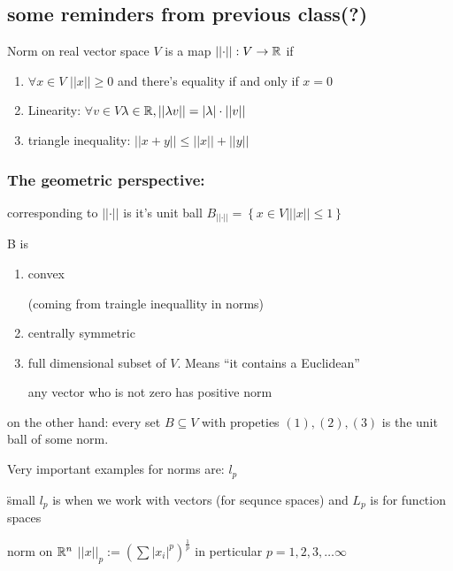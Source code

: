 \begin{insight}

\subsection{some reminders from previous class(?)}

Norm on real vector space $V$ is a map $\left|\left|\cdot\right|\right|:V\to\mathbb{R}$
if
\begin{enumerate}
\item $\forall x\in V$ $\left|\left|x\right|\right|\ge0$ and there\textquoteright s
equality if and only if $x=0$
\item Linearity: $\forall v\in V$$\lambda\in\mathbb{R},\left|\left|\lambda v\right|\right|=\left|\lambda\right|\cdot\left|\left|v\right|\right|$
\item triangle inequality: $\left|\left|x+y\right|\right|\le\left|\left|x\right|\right|+\left|\left|y\right|\right|$
\end{enumerate}
%

\subsubsection{The geometric perspective:}

corresponding to $\left|\left|\cdot\right|\right|$ is it's unit ball
$B_{\left|\left|\cdot\right|\right|}=\left\{ x\in V|\left|\left|x\right|\right|\le1\right\} $
\begin{fact}
B is
\begin{enumerate}
\item convex %
\begin{insight}
(coming from traingle inequallity in norms)%
\end{insight}
\item centrally symmetric
\item full dimensional subset of $V$. Means ``it contains a Euclidean''
\begin{insight}
any vector who is not zero has positive norm%
\end{insight}
\end{enumerate}
\end{fact}

on the other hand: every set $B\subseteq V$ with propeties $\left(1\right),\left(2\right),\left(3\right)$
is the unit ball of some norm.
\begin{example}
Very important examples for norms are: $l_{p}$%
\begin{insight}
\"{s}mall $l_{p}$ is when we work with vectors (for sequnce spaces)
and $L_{p}$ is for function spaces%
\end{insight}
{} norm on $\mathbb{R}^{n}$ $\left|\left|x\right|\right|_{p}:=\left(\sum\left|x_{i}\right|^{p}\right)^{\frac{1}{p}}$
in perticular $p=1,2,3,\dots\infty$
\end{example}

\end{insight}

